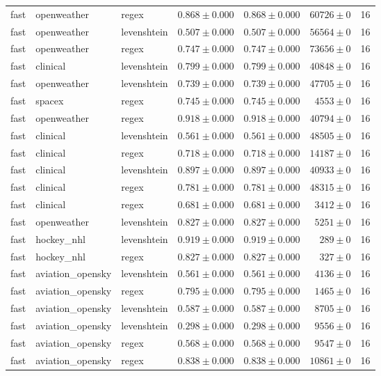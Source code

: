 \begin{table}[htbp]
\begin{tabular}{l l l r r r r}
fast & openweather & regex & $0.868\pm0.000$ & $0.868\pm0.000$ & $60726\pm0$ & 16 \\
fast & openweather & levenshtein & $0.507\pm0.000$ & $0.507\pm0.000$ & $56564\pm0$ & 16 \\
fast & openweather & regex & $0.747\pm0.000$ & $0.747\pm0.000$ & $73656\pm0$ & 16 \\
fast & clinical & levenshtein & $0.799\pm0.000$ & $0.799\pm0.000$ & $40848\pm0$ & 16 \\
fast & openweather & levenshtein & $0.739\pm0.000$ & $0.739\pm0.000$ & $47705\pm0$ & 16 \\
fast & spacex & regex & $0.745\pm0.000$ & $0.745\pm0.000$ & $4553\pm0$ & 16 \\
fast & openweather & regex & $0.918\pm0.000$ & $0.918\pm0.000$ & $40794\pm0$ & 16 \\
fast & clinical & levenshtein & $0.561\pm0.000$ & $0.561\pm0.000$ & $48505\pm0$ & 16 \\
fast & clinical & regex & $0.718\pm0.000$ & $0.718\pm0.000$ & $14187\pm0$ & 16 \\
fast & clinical & levenshtein & $0.897\pm0.000$ & $0.897\pm0.000$ & $40933\pm0$ & 16 \\
fast & clinical & regex & $0.781\pm0.000$ & $0.781\pm0.000$ & $48315\pm0$ & 16 \\
fast & clinical & regex & $0.681\pm0.000$ & $0.681\pm0.000$ & $3412\pm0$ & 16 \\
fast & openweather & levenshtein & $0.827\pm0.000$ & $0.827\pm0.000$ & $5251\pm0$ & 16 \\
fast & hockey\_nhl & levenshtein & $0.919\pm0.000$ & $0.919\pm0.000$ & $289\pm0$ & 16 \\
fast & hockey\_nhl & regex & $0.827\pm0.000$ & $0.827\pm0.000$ & $327\pm0$ & 16 \\
fast & aviation\_opensky & levenshtein & $0.561\pm0.000$ & $0.561\pm0.000$ & $4136\pm0$ & 16 \\
fast & aviation\_opensky & regex & $0.795\pm0.000$ & $0.795\pm0.000$ & $1465\pm0$ & 16 \\
fast & aviation\_opensky & levenshtein & $0.587\pm0.000$ & $0.587\pm0.000$ & $8705\pm0$ & 16 \\
fast & aviation\_opensky & levenshtein & $0.298\pm0.000$ & $0.298\pm0.000$ & $9556\pm0$ & 16 \\
fast & aviation\_opensky & regex & $0.568\pm0.000$ & $0.568\pm0.000$ & $9547\pm0$ & 16 \\
fast & aviation\_opensky & regex & $0.838\pm0.000$ & $0.838\pm0.000$ & $10861\pm0$ & 16 \\

\end{tabular}
\end{table}
